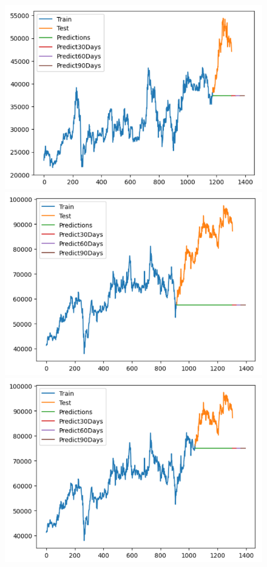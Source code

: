 \begin{figure}[H]
\begin{minipage}{0.15\textwidth}
    \centering
    \includegraphics[width=1\textwidth]{resources/chapter-5/newdata1/result/BIDV_ARIMA_9-1.png}
    \end{minipage}
    \hfill
    \begin{minipage}{0.15\textwidth}
    \centering
    \includegraphics[width=1\textwidth]{resources/chapter-5/newdata1/result/VCB_ARIMA_7-3.png}
    \end{minipage}
    \hfill
    \begin{minipage}{0.15\textwidth}
    \centering
    \includegraphics[width=1\textwidth]{resources/chapter-5/newdata1/result/VCB_ARIMA_8-2.png}

\end{minipage}
\end{figure}
